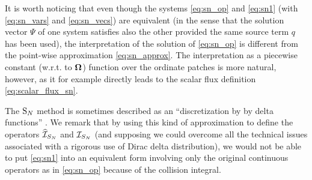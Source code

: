 It is worth noticing that even though the systems \eqref{eq:sn_op}
and \eqref{eq:sn1} (with \eqref{eq:sn_vars} and \eqref{eq:sn_vecs}) are equivalent (in the sense that the solution
vector $\Psi$ of one system satisfies also the other provided the same source term $q$ has been used), the
interpretation of the solution of \eqref{eq:sn_op} is different from the point-wise approximation \eqref{eq:sn_approx}. The interpretation as a piecewise constant (w.r.t. to $\mathbf{\Omega}$) function over the ordinate patches is more natural, however, as it for example directly leads to the scalar flux definition \eqref{eq:scalar_flux_sn}.
 
The $\text{S}_{N}$ method is sometimes described as an ``discretization by by delta functions'' \cite[p.133]{Chang}.
We remark that by using this kind of approximation to define the operators $\widehat{{\mathcal{I}}}_{S_N}$ and ${\mathcal{I}}_{S_N}$ (and supposing we
could overcome all the technical issues associated with a rigorous use of Dirac delta distribution), we would not be able to
put \eqref{eq:sn1} into an equivalent form involving only the original continuous operators as in \eqref{eq:sn_op}
because of the collision integral. 

